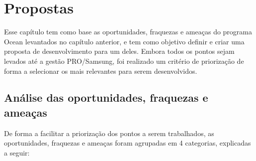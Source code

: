 \chapter{Propostas}
\label{cha:propostas}

Esse capítulo tem como base as oportunidades, fraquezas e ameaças do programa Ocean levantados no capítulo anterior, e tem como objetivo definir e criar uma proposta de desenvolvimento para um deles. Embora todos os pontos sejam levados até a gestão PRO/Samsung, foi realizado um critério de priorização de forma a selecionar os mais relevantes para serem desenvolvidos.

\section{Análise das oportunidades, fraquezas e ameaças}

De forma a facilitar a priorização dos pontos a serem trabalhados, as oportunidades, fraquezas e ameaças foram agrupadas em 4 categorias, explicadas a seguir: 

